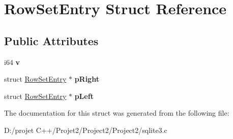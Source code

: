 \hypertarget{struct_row_set_entry}{}\section{Row\+Set\+Entry Struct Reference}
\label{struct_row_set_entry}
\subsection*{Public Attributes}
\begin{DoxyCompactItemize}
\item 
\mbox{\label{struct_row_set_entry_ac72670935246f1bff5e4d96703574071}} 
i64 {\bfseries v}
\item 
\mbox{\label{struct_row_set_entry_ac39c09525dd24f42af522587d1bc5026}} 
struct \mbox{\hyperlink{struct_row_set_entry}{Row\+Set\+Entry}} $\ast$ {\bfseries p\+Right}
\item 
\mbox{\label{struct_row_set_entry_a59365203c30ce782ae38e534c90db14b}} 
struct \mbox{\hyperlink{struct_row_set_entry}{Row\+Set\+Entry}} $\ast$ {\bfseries p\+Left}
\end{DoxyCompactItemize}


The documentation for this struct was generated from the following file\+:\begin{DoxyCompactItemize}
\item 
D\+:/projet C++/\+Projet2/\+Project2/\+Project2/sqlite3.\+c\end{DoxyCompactItemize}
